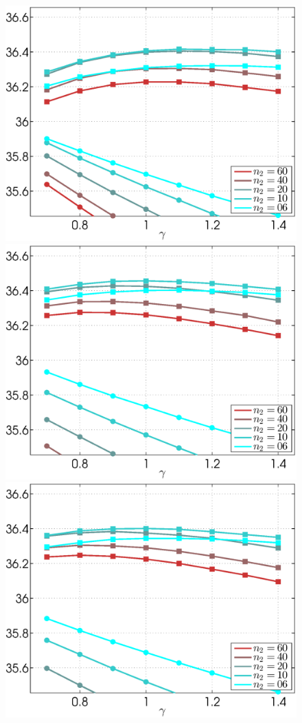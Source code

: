 \documentclass{ipol}
\begin{document}
\begin{figure}[ht!]
	\centering
	\includegraphics[width=.33\textwidth]{f/nldct/STB1STB2-vs-WIn1WIE2_fpsnr_np2-g-curves_1np010_s10_average.eps}%
	\includegraphics[width=.33\textwidth]{f/nldct/STB1STB2-vs-WIn1WIE2_fpsnr_np2-g-curves_1np040_s10_average.eps}%
	\includegraphics[width=.33\textwidth]{f/nldct/STB1STB2-vs-WIn1WIE2_fpsnr_np2-g-curves_1np100_s10_average.eps}\\
                                                        

\end{figure}
\end{document}
